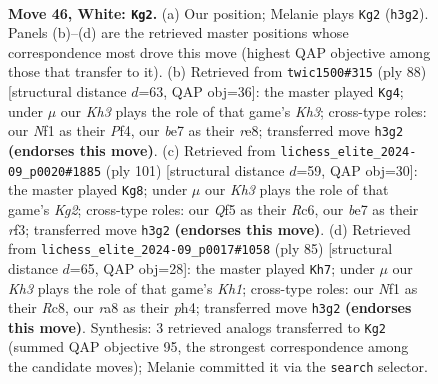 \documentclass[11pt]{article}
\begin{document}
\clearpage

\begin{figure}[p]\centering
\begin{subfigure}{0.46\textwidth}\centering
\resizebox{\linewidth}{!}{%
\newchessgame
\chessboard[
  setfen={r5r1/p3b1p1/2k4p/3p1Q1P/pq1P2P1/4P2K/8/5N2 w - - 0 46},
  showmover=false,
  pgfstyle=straightmove, color=movearrow, markmove={h3-g2}
]}
\caption{}
\end{subfigure}\hfill
\begin{subfigure}{0.46\textwidth}\centering
\resizebox{\linewidth}{!}{%
\newchessgame
\chessboard[
  setfen={2q1r1k1/5p1p/P3pQp1/4P3/5P2/6PK/7P/8 w - - 5 45},
  showmover=false,
  pgfstyle=straightmove, color=movearrow, markmove={h3-g4}
]}
\caption{}
\end{subfigure}
\\[4pt]
\begin{subfigure}{0.46\textwidth}\centering
\resizebox{\linewidth}{!}{%
\newchessgame
\chessboard[
  setfen={8/5pk1/2r3p1/1p1pP3/q2P3P/p1P2RK1/P7/5Q2 b - - 5 51},
  showmover=false,
  pgfstyle=straightmove, color=movearrow, markmove={g7-g8}
]}
\caption{}
\end{subfigure}\hfill
\begin{subfigure}{0.46\textwidth}\centering
\resizebox{\linewidth}{!}{%
\newchessgame
\chessboard[
  setfen={2r4k/p5p1/2q2p1p/4p3/1P5P/2PR2P1/3Q1P1K/8 b - - 1 43},
  showmover=false,
  pgfstyle=straightmove, color=movearrow, markmove={h8-h7}
]}
\caption{}
\end{subfigure}
\caption{\textbf{Move 46, White: \texttt{Kg2}.} (a) Our position; Melanie plays \texttt{Kg2} (\texttt{h3g2}). Panels (b)--(d) are the retrieved master positions whose correspondence most drove this move (highest QAP objective among those that transfer to it). (b) Retrieved from \texttt{twic1500\#315} (ply 88) [structural distance $d$=63, QAP obj=36]: the master played \texttt{Kg4}; under $\mu$ our \emph{Kh3} plays the role of that game's \emph{Kh3}; cross-type roles: our \emph{N}f1 as their \emph{P}f4, our \emph{b}e7 as their \emph{r}e8; transferred move \texttt{h3g2} \textbf{(endorses this move)}. (c) Retrieved from \texttt{lichess\_elite\_2024-09\_p0020\#1885} (ply 101) [structural distance $d$=59, QAP obj=30]: the master played \texttt{Kg8}; under $\mu$ our \emph{Kh3} plays the role of that game's \emph{Kg2}; cross-type roles: our \emph{Q}f5 as their \emph{R}c6, our \emph{b}e7 as their \emph{r}f3; transferred move \texttt{h3g2} \textbf{(endorses this move)}. (d) Retrieved from \texttt{lichess\_elite\_2024-09\_p0017\#1058} (ply 85) [structural distance $d$=65, QAP obj=28]: the master played \texttt{Kh7}; under $\mu$ our \emph{Kh3} plays the role of that game's \emph{Kh1}; cross-type roles: our \emph{N}f1 as their \emph{R}c8, our \emph{r}a8 as their \emph{p}h4; transferred move \texttt{h3g2} \textbf{(endorses this move)}. Synthesis: 3 retrieved analogs transferred to \texttt{Kg2} (summed QAP objective 95, the strongest correspondence among the candidate moves); Melanie committed it via the \texttt{search} selector.}
\label{fig:thought-m90}
\end{figure}
\end{document}
